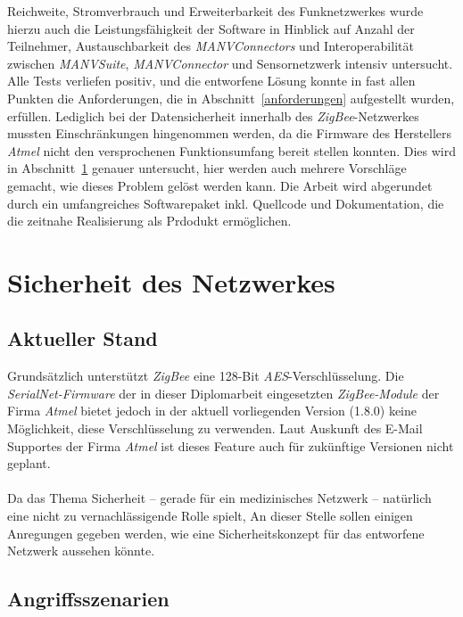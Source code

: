 Reichweite, Stromverbrauch und Erweiterbarkeit des Funknetzwerkes wurde hierzu auch die Leistungsfähigkeit der 
Software in Hinblick auf Anzahl der Teilnehmer, Austauschbarkeit des \emph{MANVConnectors} und Interoperabilität
zwischen \emph{MANVSuite}, \emph{MANVConnector} und Sensornetzwerk intensiv untersucht. Alle Tests verliefen
positiv, und die entworfene Lösung konnte in fast allen Punkten die Anforderungen, die in Abschnitt~\ref{anforderungen}
aufgestellt wurden, erfüllen. Lediglich bei der Datensicherheit innerhalb des \emph{ZigBee}-Netzwerkes mussten
Einschränkungen hingenommen werden, da die Firmware des Herstellers \emph{Atmel} nicht den versprochenen
Funktionsumfang bereit stellen konnten. Dies wird in Abschnitt~\ref{Sicherheit} genauer untersucht, hier werden
auch mehrere Vorschläge gemacht, wie dieses Problem gelöst werden kann. Die Arbeit wird abgerundet durch ein
umfangreiches Softwarepaket inkl. Quellcode und Dokumentation, die die zeitnahe Realisierung als Prdodukt ermöglichen.

\section{Sicherheit des Netzwerkes}
\label{Sicherheit}
\subsection{Aktueller Stand}
Grundsätzlich unterstützt \emph{ZigBee} eine 128-Bit \emph{AES}-Verschlüsselung. Die \emph{SerialNet-Firmware} der in 
dieser Diplomarbeit eingesetzten \emph{ZigBee-Module} der Firma \emph{Atmel} bietet jedoch in der aktuell vorliegenden 
Version (1.8.0) keine Möglichkeit, diese Verschlüsselung zu verwenden. Laut Auskunft des E-Mail Supportes der Firma 
\emph{Atmel} ist dieses Feature auch für zukünftige Versionen nicht geplant.\\
\\
Da das Thema Sicherheit -- gerade für ein medizinisches Netzwerk -- natürlich eine nicht zu vernachlässigende Rolle spielt,
An dieser Stelle sollen einigen Anregungen gegeben werden, wie eine Sicherheitskonzept für das entworfene Netzwerk aussehen 
könnte.

\subsection{Angriffsszenarien}

